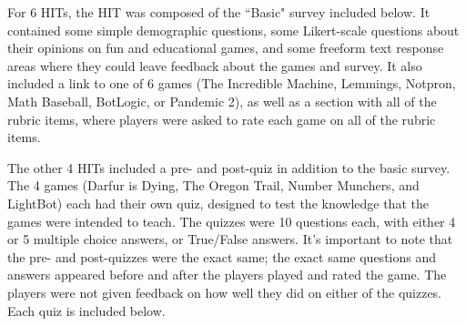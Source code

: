 		For 6 HITs, the HIT was composed of the ``Basic" survey included below. It contained some simple demographic questions, some Likert-scale questions about their opinions on fun and educational games, and some freeform text response areas where they could leave feedback about the games and survey. It also included a link to one of 6 games (The Incredible Machine, Lemmings, Notpron, Math Baseball, BotLogic, or Pandemic 2), as well as a section with all of the rubric items, where players were asked to rate each game on all of the rubric items.

		The other 4 HITs included a pre- and post-quiz in addition to the basic survey. The 4 games (Darfur is Dying, The Oregon Trail, Number Munchers, and LightBot) each had their own quiz, designed to test the knowledge that the games were intended to teach. The quizzes were 10 questions each, with either 4 or 5 multiple choice answers, or True/False answers. It's important to note that the pre- and post-quizzes were the exact same; the exact same questions and answers appeared before and after the players played and rated the game. The players were not given feedback on how well they did on either of the quizzes. Each quiz is included below.  






\newpage
	

